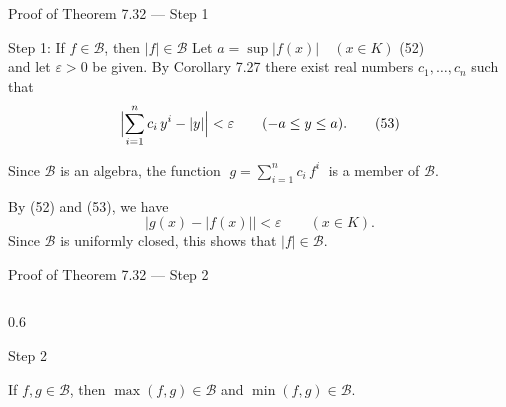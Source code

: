 \documentclass[aspectratio=169,12pt,t]{beamer}
\begin{document}
{%
\begin{frame}{Proof of Theorem 7.32 --- Step 1}
  \small
  \begin{proofblock}{Step 1: If $f \in \mathscr{B}$, then $|f| \in \mathscr{B}$}
    Let \quad $a = \sup |f(x)| \quad (x \in K)$ \hfill (52)\\[2pt]
    and let $\varepsilon > 0$ be given. By Corollary 7.27 there exist real numbers
    $c_1, \dots, c_n$ such that
    \[
      \Bigl| \sum_{i=1}^{n} c_i\,y^i - |y| \Bigr| < \varepsilon \qquad (-a \le y \le a). \tag{53}
    \]

    Since $\mathscr{B}$ is an algebra, the function $\;g = \sum_{i=1}^{n} c_i\,f^i\;$ is a member of $\mathscr{B}$.

    By (52) and (53), we have
    \[
      \bigl| g(x) - |f(x)| \bigr| < \varepsilon \qquad (x \in K).
    \]
    Since $\mathscr{B}$ is uniformly closed, this shows that $|f| \in \mathscr{B}$.
  \end{proofblock}

\end{frame}

\begin{frame}{Proof of Theorem 7.32 --- Step 2}
  \begin{columns}[T]
    \begin{column}{0.6\textwidth}
      \small
      \begin{proofblock}{Step 2}
        \raggedright
        If $f, g \in \mathscr{B}$, then $\max(f,g) \in \mathscr{B}$ and $\min(f,g) \in \mathscr{B}$.


\end{proofblock}
\end{column}
\end{columns}
\end{frame}}
\end{document}
